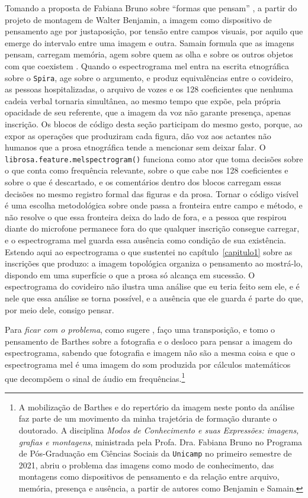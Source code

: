 Tomando a proposta de Fabiana Bruno sobre \enquote{formas que pensam} \parencite{Bruno2019Tese}, a partir do projeto de montagem de Walter Benjamin, a imagem como dispositivo de pensamento age por justaposição, por tensão entre campos visuais, por aquilo que emerge do intervalo entre uma imagem e outra. Samain formula que as imagens pensam, carregam memória, agem sobre quem as olha e sobre os outros objetos com que coexistem \parencite{Samain2012Pensam}. Quando o espectrograma mel entra na escrita etnográfica sobre o \texttt{Spira}, age sobre o argumento, e produz equivalências entre o covideiro, as pessoas hospitalizadas, o arquivo de vozes e os 128 coeficientes que nenhuma cadeia verbal tornaria simultânea, ao mesmo tempo que expõe, pela própria opacidade de seu referente, que a imagem da voz não garante presença, apenas inscrição. Os blocos de código desta seção participam do mesmo gesto, porque, ao expor as operações que produziram cada figura, dão voz aos actantes não humanos que a prosa etnográfica tende a mencionar sem deixar falar. O \texttt{librosa.feature.melspectrogram()} funciona como ator que toma decisões sobre o que conta como frequência relevante, sobre o que cabe nos 128 coeficientes e sobre o que é descartado, e os comentários dentro dos blocos carregam essas decisões no mesmo registro formal das figuras e da prosa. Tornar o código visível é uma escolha metodológica sobre onde passa a fronteira entre campo e método, e não resolve o que essa fronteira deixa do lado de fora, e a pessoa que respirou diante do microfone permanece fora do que qualquer inscrição consegue carregar, e o espectrograma mel guarda essa ausência como condição de sua existência. Estendo aqui ao espectrograma o que sustentei no capítulo~\ref{capitulo1} sobre as inscrições que produzo: a imagem topológica organiza o pensamento ao mostrá-lo, dispondo em uma superfície o que a prosa só alcança em sucessão. O espectrograma do covideiro não ilustra uma análise que eu teria feito sem ele, e é nele que essa análise se torna possível, e a ausência que ele guarda é parte do que, por meio dele, consigo pensar.

Para \textit{ficar com o problema}, como sugere \textcite{Haraway2016Staying}, faço uma transposição, e tomo o pensamento de Barthes sobre a fotografia e o desloco para pensar a imagem do espectrograma, sabendo que fotografia e imagem não são a mesma coisa e que o espectrograma mel é uma imagem do som produzida por cálculos matemáticos que decompõem o sinal de áudio em frequências.\footnote{A mobilização de Barthes e do repertório da imagem neste ponto da análise faz parte de um movimento da minha trajetória de formação durante o doutorado. A disciplina \textit{Modos de Conhecimento e suas Expressões: imagens, grafias e montagens}, ministrada pela Profa. Dra. Fabiana Bruno no Programa de Pós-Graduação em Ciências Sociais da \texttt{Unicamp} no primeiro semestre de 2021, abriu o problema das imagens como modo de conhecimento, das montagens como dispositivos de pensamento e da relação entre arquivo, memória, presença e ausência, a partir de autores como Benjamin e Samain.}

